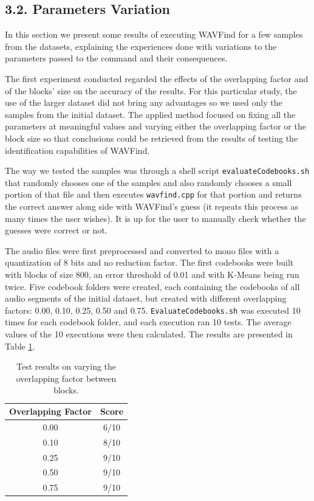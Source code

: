 \documentclass[12pt]{article}
\begin{document}
\subsection*{3.2. Parameters Variation}

In this section we present some results of executing WAVFind for a few samples
from the datasets, explaining the experiences done with variations to the 
parameters passed to the command and their consequences.

The first experiment conducted regarded the effects of the overlapping factor 
and of the blocks' size on the accuracy of the results.
For this particular study, the use of the larger dataset did not bring any 
advantages so we used only the samples from the initial dataset.
The applied method focused on fixing all the parameters at meaningful values and
varying either the overlapping factor or the block size so that conclusions 
could be retrieved from the results of testing the identification capabilities 
of WAVFind.

The way we tested the samples was through a shell script \texttt{evaluateCodebooks.sh}
that randomly chooses one of the samples and also randomly chooses a small portion
of that file and then executes \texttt{wavfind.cpp} for that portion and returns
the correct answer along side with WAVFind's guess (it repeats this process as 
many times the user wishes). 
It is up for the user to manually check whether the guesses were correct or not.

The audio files were first preprocessed and converted to mono files with a 
quantization of 8 bits and no reduction factor.
The first codebooks were built with blocks of size 800, an error threshold of 
0.01 and with K-Means being run twice.
Five codebook folders were created, each containing the codebooks of all audio
segments of the initial dataset, but created with different overlapping factors:
0.00, 0.10, 0.25, 0.50 and 0.75. 
\texttt{EvaluateCodebooks.sh} was executed 10 times for each codebook folder,
and each execution ran 10 tests.
The average values of the 10 executions were then calculated.
The results are presented in Table \ref{tab:overlapFactor}.

\begin{table}[H]
  \begin{center}
    \begin{tabular}{c|c}
      \textbf{Overlapping Factor} & \textbf{Score}\\
      \hline
      0.00 & 6/10\\
      0.10 & 8/10\\
      0.25 & 9/10\\
      0.50 & 9/10\\
      0.75 & 9/10\\
    \end{tabular}
  \end{center}
  \caption{Test results on varying the overlapping factor between blocks.}
  \label{tab:overlapFactor}
\end{table}
\end{document}
